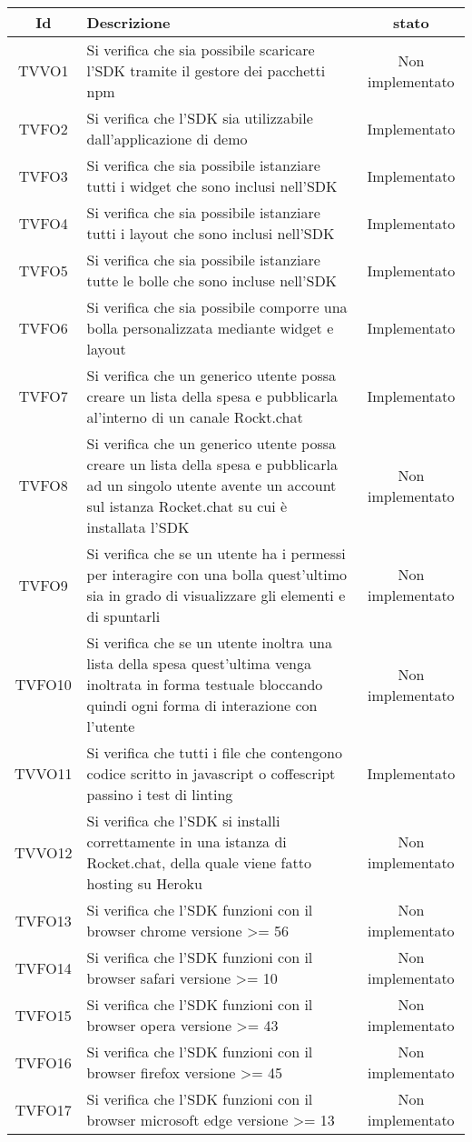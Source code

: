\begin{center}
	\begin{longtable}{|c|>{\centering}m{10cm}|c|}\hline
		Id & Descrizione & stato \\ \hline
		TVVO1 & Si verifica che sia possibile scaricare l'SDK tramite il gestore dei pacchetti npm & Non implementato \\ \hline
		TVFO2 & Si verifica che l'SDK sia utilizzabile dall'applicazione di demo & Implementato \\ \hline
		TVFO3 & Si verifica che sia possibile istanziare tutti i widget che sono inclusi nell'SDK & Implementato \\ \hline
		TVFO4 & Si verifica che sia possibile istanziare tutti i layout che sono inclusi nell'SDK & Implementato \\ \hline
		TVFO5 & Si verifica che sia possibile istanziare tutte le bolle che sono incluse nell'SDK & Implementato \\ \hline
		TVFO6 & Si verifica che sia possibile comporre una bolla personalizzata mediante widget e layout & Implementato \\ \hline
		TVFO7 & Si verifica che un generico utente possa creare un lista della spesa e pubblicarla al'interno di un canale Rockt.chat & Implementato \\ \hline
		TVFO8 & Si verifica che un generico utente possa creare un lista della spesa e pubblicarla ad un singolo utente avente un account sul istanza Rocket.chat su cui è installata l'SDK & Non implementato \\ \hline
		TVFO9 & Si verifica che se un utente ha i permessi per interagire con una bolla quest'ultimo sia in grado di visualizzare gli elementi e di spuntarli & Non implementato \\ \hline
		TVFO10 & Si verifica che se un utente inoltra una lista della spesa quest'ultima venga inoltrata in forma testuale bloccando quindi ogni forma di interazione con l'utente & Non implementato \\ \hline
		TVVO11 & Si verifica che tutti i file che contengono codice scritto in javascript o coffescript passino i test di linting & Implementato \\ \hline
		TVVO12 & Si verifica che l'SDK si installi correttamente in una istanza di Rocket.chat, della quale viene fatto hosting su Heroku & Non implementato \\ \hline
		TVFO13 & Si verifica che l'SDK funzioni con il browser chrome versione >= 56 & Non implementato \\ \hline
		TVFO14 & Si verifica che l'SDK funzioni con il browser safari versione >= 10 & Non implementato \\ \hline
		TVFO15 & Si verifica che l'SDK funzioni con il browser opera versione >= 43 & Non implementato \\ \hline
		TVFO16 & Si verifica che l'SDK funzioni con il browser firefox versione >= 45 & Non implementato \\ \hline
		TVFO17 & Si verifica che l'SDK funzioni con il browser microsoft edge versione >= 13 & Non implementato \\ \hline
	\end{longtable}
\end{center}

